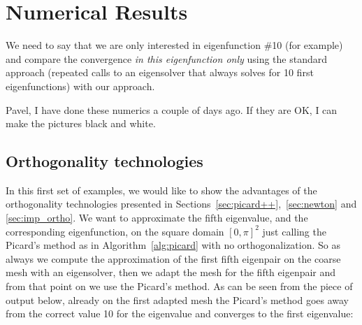 \documentclass[preprint,12pt]{elsarticle}
\begin{document}









\section{Numerical Results} \label{sec:numer}

{\red We need to say that we are only interested in eigenfunction \#10 (for example)
and compare the convergence {\em in this eigenfunction only} 
using the standard approach (repeated calls to an 
eigensolver that always solves for 10 first eigenfunctions) with our approach.}

{\red Pavel, I have done these numerics a couple of days ago. If they are OK, I can make the pictures black and white.}

\subsection{Orthogonality technologies}\label{ssec:ortho}

In this first set of examples, we would like to show the advantages of the orthogonality technologies presented in Sections~\ref{sec:picard++},~\ref{sec:newton} and \ref{sec:imp_ortho}.
We want to approximate the fifth eigenvalue, and the corresponding eigenfunction, on the square domain $[0,\pi]^2$ just calling the Picard's method as in Algorithm~\ref{alg:picard} with no orthogonalization.
So as always we compute the approximation of the first fifth eigenpair on the coarse mesh with an eigensolver, then we adapt the mesh for the fifth eigenpair and from that point on we use the Picard's method.
As can be seen from the piece of output below, already on the first adapted mesh the Picard's method goes away from the correct value 10 for the eigenvalue and converges to the first eigenvalue: 
\end{document}
